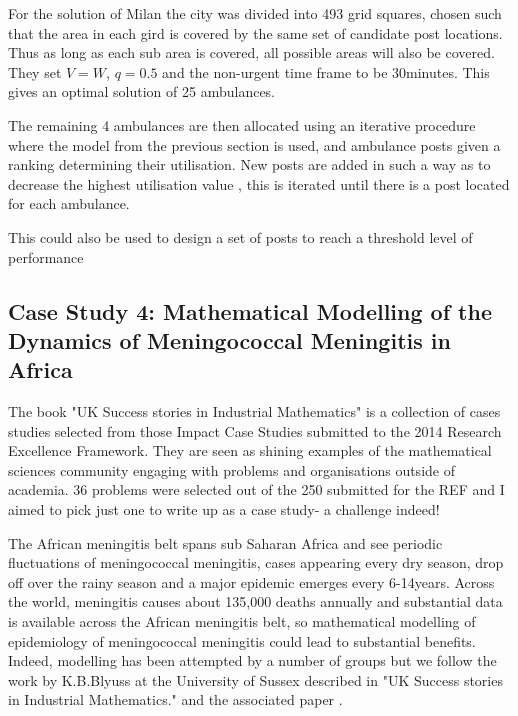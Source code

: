 \documentclass[11pt]{article} %
\begin{document}
 
For the solution of Milan the city was divided into 493 grid squares, chosen such that the area in each gird is covered by the same set of candidate post locations. Thus as long as each sub area is covered, all possible areas will also be covered. They set $ V=W $, $ q=0.5 $ and the non-urgent time frame to be 30minutes. This gives an optimal solution of 25 ambulances.

The remaining 4 ambulances are then allocated using an iterative procedure where the model from the previous section is used, and ambulance posts given  a ranking determining their utilisation. New posts are added in such a way as to decrease the highest utilisation value , this is iterated until there is a post located for each ambulance. 

This could also be used to design a set of posts to reach a threshold level of performance
	\subsection{Case Study 4: Mathematical Modelling of the Dynamics of Meningococcal Meningitis in Africa \label{Africa }}
The book "UK Success stories in Industrial Mathematics" \cite{Aston2016} is a collection of cases studies selected from those Impact Case Studies submitted to the 2014 Research Excellence Framework. They are seen as shining examples of the mathematical sciences community engaging with problems and organisations outside of academia. 36 problems were selected out of the 250 submitted for the REF and I aimed to pick just one to write up as a case study- a challenge indeed!


The African meningitis belt spans sub Saharan Africa and see periodic fluctuations of meningococcal meningitis, cases appearing every dry season, drop off over the rainy season and a major epidemic emerges every 6-14years. Across the world, meningitis causes about 135,000 deaths annually and substantial data is available across the African meningitis belt, so mathematical modelling of epidemiology of meningococcal meningitis could lead to substantial benefits. Indeed, modelling has been attempted by a number of groups but we follow the work by K.B.Blyuss at the University of Sussex described in "UK Success stories in Industrial Mathematics." and the associated paper \cite{Irving2012}.
\end{document}
